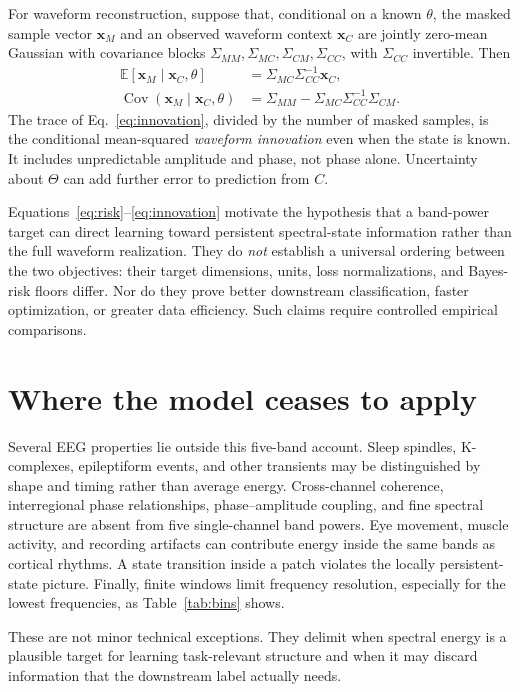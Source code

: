 \documentclass[11pt,a4paper]{article}
\newcommand{\E}{\mathbb{E}}
\newcommand{\Cov}{\operatorname{Cov}}
\begin{document}
For waveform reconstruction, suppose that, conditional on a known $\theta$,
the masked sample vector $\bm x_M$ and an observed waveform context $\bm x_C$
are jointly zero-mean Gaussian with covariance blocks
$\Sigma_{MM},\Sigma_{MC},\Sigma_{CM},\Sigma_{CC}$, with $\Sigma_{CC}$ invertible.
Then
\begin{align}
\E[\bm x_M\mid\bm x_C,\theta]
&=\Sigma_{MC}\Sigma_{CC}^{-1}\bm x_C,\label{eq:wiener}\\
\Cov(\bm x_M\mid\bm x_C,\theta)
&=\Sigma_{MM}-\Sigma_{MC}\Sigma_{CC}^{-1}\Sigma_{CM}.
\label{eq:innovation}
\end{align}
The trace of Eq.~\eqref{eq:innovation}, divided by the number of masked samples,
is the conditional mean-squared \emph{waveform innovation} even when the state
is known. It includes unpredictable amplitude and phase, not phase alone.
Uncertainty about $\Theta$ can add further error to prediction from $C$.

Equations~\eqref{eq:risk}--\eqref{eq:innovation} motivate the hypothesis that
a band-power target can direct learning toward persistent spectral-state
information rather than the full waveform realization. They do \emph{not}
establish a universal ordering between the two objectives: their target
dimensions, units, loss normalizations, and Bayes-risk floors differ. Nor do
they prove better downstream classification, faster optimization, or greater
data efficiency. Such claims require controlled empirical comparisons.

\section{Where the model ceases to apply}

Several EEG properties lie outside this five-band account. Sleep spindles,
K-complexes, epileptiform events, and other transients may be distinguished by
shape and timing rather than average energy. Cross-channel coherence,
interregional phase relationships, phase--amplitude coupling, and fine spectral
structure are absent from five single-channel band powers. Eye movement,
muscle activity, and recording artifacts can contribute energy inside the same
bands as cortical rhythms. A state transition inside a patch violates the
locally persistent-state picture. Finally, finite windows limit frequency
resolution, especially for the lowest frequencies, as Table~\ref{tab:bins}
shows.

These are not minor technical exceptions. They delimit when spectral energy
is a plausible target for learning task-relevant structure and when it may
discard information that the downstream label actually needs.
\end{document}
